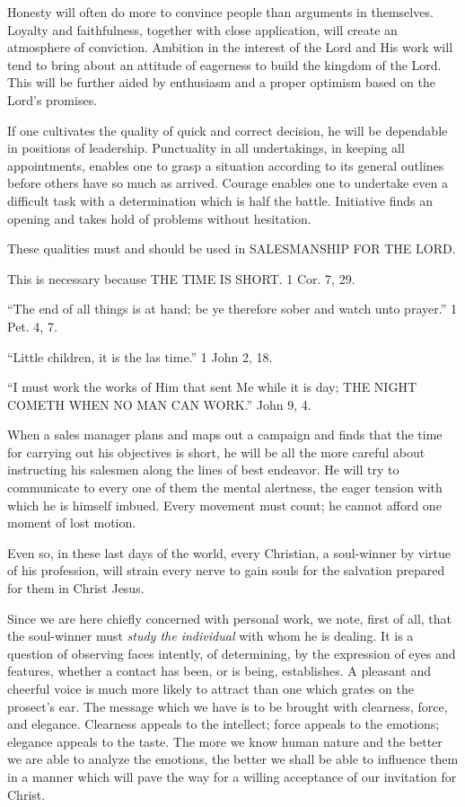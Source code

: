 \documentclass[
]{book}
\begin{document}
Honesty will often do more to convince people than arguments in themselves. Loyalty and faithfulness, together with close application, will create an atmosphere of conviction. Ambition in the interest of the Lord and His work will tend to bring about an attitude of eagerness to build the kingdom of the Lord. This will be further aided by enthusiasm and a proper optimism based on the Lord's promises.

If one cultivates the quality of quick and correct decision, he will be dependable in positions of leadership. Punctuality in all undertakings, in keeping all appointments, enables one to grasp a situation according to its general outlines before others have so much as arrived. Courage enables one to undertake even a difficult task with a determination which is half the battle. Initiative finds an opening and takes hold of problems without hesitation.

These qualities must and should be used in SALESMANSHIP FOR THE LORD.

This is necessary because THE TIME IS SHORT. 1 Cor. 7, 29.

``The end of all things is at hand; be ye therefore sober and watch unto prayer.'' 1 Pet. 4, 7.

``Little children, it is the las time.'' 1 John 2, 18.

``I must work the works of Him that sent Me while it is day; THE NIGHT COMETH WHEN NO MAN CAN WORK.'' John 9, 4.

When a sales manager plans and maps out a campaign and finds that the time for carrying out his objectives is short, he will be all the more careful about instructing his salesmen along the lines of best endeavor. He will try to communicate to every one of them the mental alertness, the eager tension with which he is himself imbued. Every movement must count; he cannot afford one moment of lost motion.

Even so, in these last days of the world, every Christian, a soul-winner by virtue of his profession, will strain every nerve to gain souls for the salvation prepared for them in Christ Jesus.

Since we are here chiefly concerned with personal work, we note, first of all, that the soul-winner must \emph{study the individual} with whom he is dealing. It is a question of observing faces intently, of determining, by the expression of eyes and features, whether a contact has been, or is being, establishes. A pleasant and cheerful voice is much more likely to attract than one which grates on the prosect's ear. The message which we have is to be brought with clearness, force, and elegance. Clearness appeals to the intellect; force appeals to the emotions; elegance appeals to the taste. The more we know human nature and the better we are able to analyze the emotions, the better we shall be able to influence them in a manner which will pave the way for a willing acceptance of our invitation for Christ.
\end{document}

